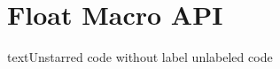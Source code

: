 \documentclass[a4paper,12pt]{report}
\begin{document}
\chapter{Float Macro API}
\begin{code}{text}{Unstarred code without label}
unlabeled code
\end{code}
\end{document}
